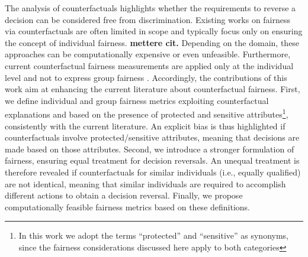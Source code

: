 \documentclass[letterpaper]{article} %
\begin{document}
The analysis of counterfactuals highlights whether the requirements to reverse a decision can be considered free from discrimination. Existing works on fairness via counterfactuals are often limited in scope and typically focus only on ensuring the concept of individual fairness. \textbf{mettere cit.}
%
Depending on the domain, these approaches can be computationally expensive or even unfeasible.
%
Furthermore, current counterfactual fairness measurements are applied only at the individual level and not to express group fairness \cite{wachter2017counterfactual}.
%
Accordingly, the contributions of this work aim at enhancing the current literature about counterfactual fairness.
%
First, we define individual and group fairness metrics exploiting counterfactual explanations and based on the presence of protected and sensitive attributes\footnote{In this work we adopt the terms ``protected'' and ``sensitive'' as synonyms, since the fairness considerations discussed here apply to both categories}, consistently with the current literature.
%
An explicit bias is thus highlighted if counterfactuals involve protected/sensitive attributes, meaning that decisions are made based on those attributes.
%
Second, we introduce a stronger formulation of fairness, ensuring equal treatment for decision reversals.
%
An unequal treatment is therefore revealed if counterfactuals for similar individuals (i.e., equally qualified) are not identical, meaning that similar individuals are required to accomplish different actions to obtain a decision reversal.
%
Finally, we propose computationally feasible fairness metrics based on these definitions.



\end{document}

